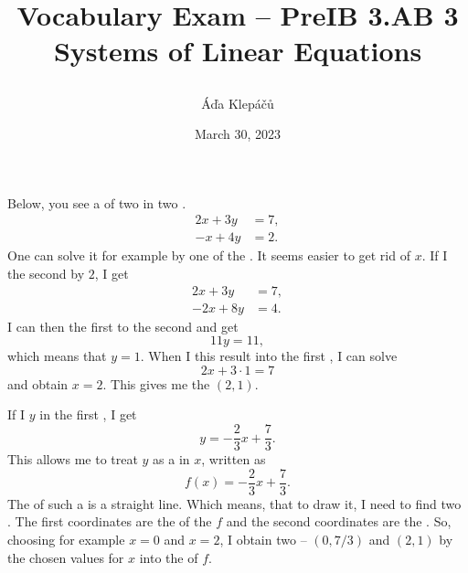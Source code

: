 \documentclass[a4paper,11pt]{article}
\title{\Huge\textsf{Vocabulary Exam -- PreIB 3.AB 3}\\
 \Large\textsf{Systems of Linear Equations}
 \author{Áďa Klepáčů}
 \date{March 30, 2023}
}
\begin{document}
\thispagestyle{fancy}

\begin{paracol}{2}
 Below, you see a \underline{\hspace{12ex}} of two \underline{\hspace{12ex}}
 \underline{\hspace{18ex}} in two \underline{\hspace{18ex}}.
 \begin{align*}
  2x + 3y &= 7, \\
  -x + 4y &= 2.
 \end{align*}
 One can solve it for example by \underline{\hspace{22ex}} one of the
 \underline{\hspace{18ex}}. It seems easier to get rid of $x$. If I
 \underline{\hspace{10ex}} the second \underline{\hspace{16ex}} by $2$, I get
 \begin{align*}
  2x + 3y &= 7,\\
  -2x + 8y &= 4.
 \end{align*}
 I can then \underline{\hspace{6ex}} the first \underline{\hspace{16ex}} to the
 second and get
 \[
  11y = 11,
 \]
 which means that $y = 1$. When I \underline{\hspace{20ex}} this result into the
 first \underline{\hspace{16ex}}, I can solve
 \[
  2x + 3 \cdot 1 = 7
 \]
 and obtain $x = 2$. This gives me the \underline{\hspace{16ex}} $(2,1)$.

 If I \underline{\hspace{14ex}} $y$ in the first \underline{\hspace{16ex}}, I
 get
 \[
  y = -\frac{2}{3}x + \frac{7}{3}.
 \]
 This allows me to treat $y$ as a \underline{\hspace{12ex}}
 \underline{\hspace{16ex}} in $x$, written as
 \[
  f(x) = -\frac{2}{3}x + \frac{7}{3}.
 \]
 The \underline{\hspace{10ex}} of such a \underline{\hspace{16ex}} is a straight
 line. Which means, that to draw it, I need to find two
 \underline{\hspace{12ex}}. The first coordinates are the
 \underline{\hspace{12ex}} of the \underline{\hspace{16ex}} $f$ and the second
 coordinates are the \underline{\hspace{14ex}}. So, choosing for example $x = 0$
 and $x = 2$, I obtain two \underline{\hspace{12ex}} -- $(0,7 / 3)$ and $(2,1)$
 by \underline{\hspace{24ex}} the chosen values for $x$ into the
 \underline{\hspace{20ex}} of $f$.


\end{paracol}
\end{document}
